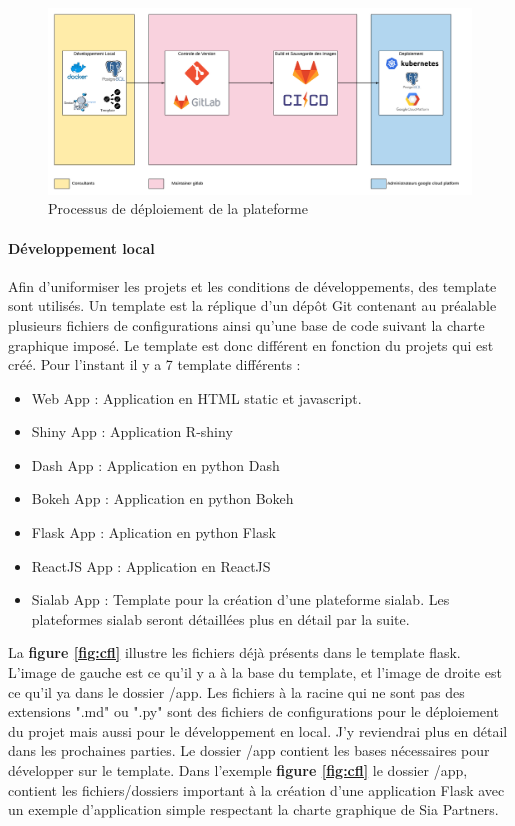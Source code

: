 \documentclass{article} %
\begin{document}
\begin{figure}[!h]
	\centering
	\includegraphics[keepaspectratio = true,scale=0.4]{structure.png}
	\caption{Processus de déploiement de la plateforme}
	\label{fig:struct}
\end{figure}

\paragraph{Développement local\\}
Afin d'uniformiser les projets et les conditions de développements, des template sont utilisés. Un template est la réplique d'un dépôt Git contenant au préalable plusieurs fichiers de configurations ainsi qu'une base de code suivant la charte graphique imposé. Le template est donc différent en fonction du projets qui est créé. Pour l'instant il y a 7 template différents :
\begin{itemize}
	\item Web App : Application en HTML static et javascript.
	\item Shiny App : Application R-shiny
	\item Dash App : Application en python Dash
	\item Bokeh App : Application en python Bokeh
	\item Flask App : Aplication en python Flask
	\item ReactJS App : Application en ReactJS
	\item Sialab App : Template pour la création d'une plateforme sialab. Les plateformes sialab seront détaillées plus en détail par la suite.
\end{itemize}

La \textbf{figure \ref{fig:cfl}} illustre les fichiers déjà présents dans le template flask.  L'image de gauche est ce qu'il y a à la base du template, et l'image de droite est ce qu'il ya dans le dossier /app. Les fichiers à la racine qui ne sont pas des extensions ".md" ou ".py" sont des fichiers de configurations pour le déploiement du projet mais aussi pour le développement en local. J'y reviendrai plus en détail dans les prochaines parties. Le dossier /app contient les bases nécessaires pour développer sur le template. Dans l'exemple \textbf{figure \ref{fig:cfl}} le dossier /app, contient les fichiers/dossiers important à la création d'une application Flask avec un exemple d'application simple respectant la charte graphique de Sia Partners.
\end{document}
